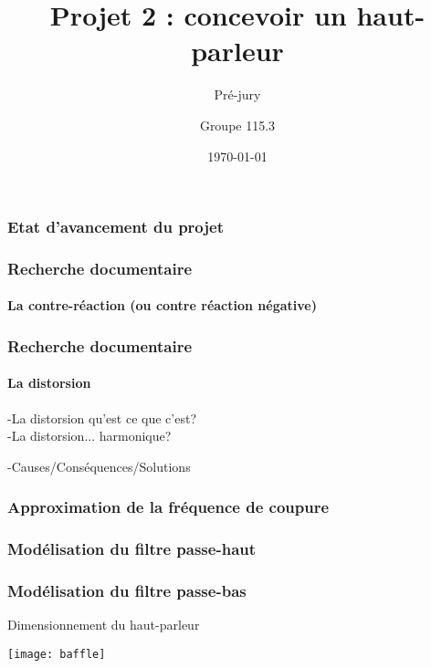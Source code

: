 \documentclass[pdf]{beamer}
\title{Projet 2 : concevoir un haut-parleur}
\subtitle{Pré-jury}
\author{Groupe 115.3}
\date{\today}
\begin{document}
\begin{frame}
	\titlepage
\end{frame}

\begin{frame}
	\frametitle{Etat d'avancement du projet}	
\end{frame}

\begin{frame}
	\frametitle{Recherche documentaire}
	\framesubtitle{La contre-réaction (ou contre réaction négative)}
	
	
	
\end{frame}

\begin{frame}
	\frametitle{Recherche documentaire}
	\framesubtitle{La distorsion}
-La distorsion qu'est ce que c'est? \\
-La distorsion... harmonique? \\
\begin{figure}[ht!]
\centering
{}
\label{Superposition d'une fréquence fondamentale et de ses premières hamoniques.}
\end{figure}
-Causes/Conséquences/Solutions
\end{frame}
	
\begin{frame}
	\frametitle{Approximation de la fréquence de coupure}
\end{frame}

\begin{frame}
	\frametitle{Modélisation du filtre passe-haut}
\end{frame}

\begin{frame}
	\frametitle{Modélisation du filtre passe-bas}
\end{frame}

\begin{frame}{Dimensionnement du haut-parleur}

\begin{center}
\texttt{[image: baffle]}
\end{center}

\end{frame}
\end{document}
